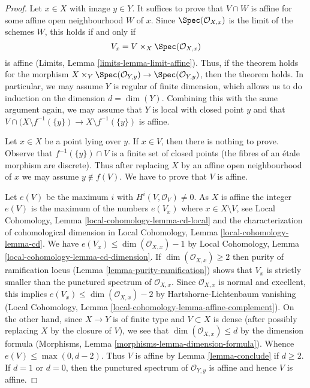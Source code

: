 \begin{proof}
Let $x \in X$ with image $y \in Y$. It suffices to prove that
$V \cap W$ is affine for some affine open neighbourhood $W$ of $x$.
Since $\Spec(\mathcal{O}_{X, x})$ is the limit of the schemes $W$,
this holds if and only if
$$
V_x = V \times_X \Spec(\mathcal{O}_{X, x})
$$
is affine (Limits, Lemma \ref{limits-lemma-limit-affine}).
Thus, if the theorem holds for the morphism
$X \times_Y \Spec(\mathcal{O}_{Y, y}) \to \Spec(\mathcal{O}_{Y, y})$,
then the theorem holds. In particular, we may assume $Y$
is regular of finite dimension, which allows us to do induction
on the dimension $d = \dim(Y)$. Combining this with the same argument again,
we may assume that $Y$ is local with closed point $y$ and that
$V \cap (X \setminus f^{-1}(\{y\}) \to X \setminus f^{-1}(\{y\})$
is affine.

\medskip\noindent
Let $x \in X$ be a point lying over $y$. If $x \in V$, then
there is nothing to prove. Observe that  $f^{-1}(\{y\}) \cap V$
is a finite set of closed points (the fibres of an \'etale morphism
are discrete). Thus after replacing $X$
by an affine open neighbourhood of $x$ we may assume
$y \not \in f(V)$. We have to prove that $V$ is affine.

\medskip\noindent
Let $e(V)$ be the maximum $i$ with $H^i(V, \mathcal{O}_V) \not = 0$.
As $X$ is affine the integer $e(V)$ is the maximum of the numbers $e(V_x)$
where $x \in X \setminus V$, see
Local Cohomology, Lemma \ref{local-cohomology-lemma-cd-local}
and the characterization of cohomological dimension
in Local Cohomology, Lemma \ref{local-cohomology-lemma-cd}.
We have $e(V_x) \leq \dim(\mathcal{O}_{X, x}) - 1$ by
Local Cohomology, Lemma \ref{local-cohomology-lemma-cd-dimension}.
If $\dim(\mathcal{O}_{X, x}) \geq 2$ then purity of
ramification locus (Lemma \ref{lemma-purity-ramification})
shows that $V_x$ is strictly smaller than the punctured spectrum of
$\mathcal{O}_{X, x}$. Since $\mathcal{O}_{X, x}$ is
normal and excellent, this implies
$e(V_x) \leq \dim(\mathcal{O}_{X, x}) - 2$ by
Hartshorne-Lichtenbaum vanishing
(Local Cohomology, Lemma \ref{local-cohomology-lemma-affine-complement}).
On the other hand, since $X \to Y$ is of finite type
and $V \subset X$ is dense (after possibly replacing $X$
by the closure of $V$), we see that $\dim(\mathcal{O}_{X, x}) \leq d$
by the dimension formula
(Morphisms, Lemma \ref{morphisms-lemma-dimension-formula}).
Whence $e(V) \leq \max(0, d -  2)$.
Thus $V$ is affine by Lemma \ref{lemma-conclude}
if $d \geq 2$. If $d = 1$ or $d = 0$, then the punctured spectrum of
$\mathcal{O}_{Y, y}$ is affine and hence $V$ is affine.
\end{proof}




